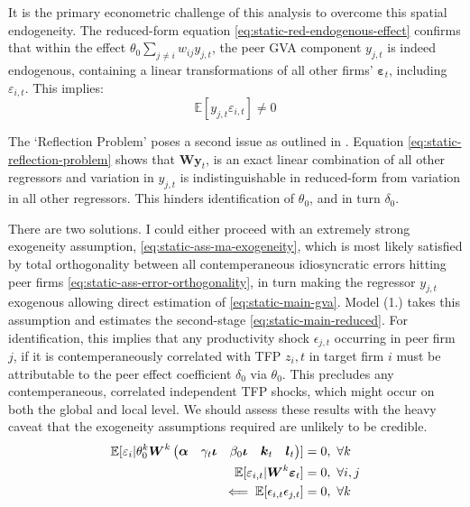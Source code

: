 It is the primary econometric challenge of this analysis to overcome this spatial endogeneity.
The reduced-form equation \eqref{eq:static-red-endogenous-effect} confirms that
within the  effect $\theta_0 \sum_{j\neq i} w_{ij} y_{j,t}$,
the peer GVA component $y_{j,t}$ is indeed endogenous,
containing a linear transformations of all other firms' $\boldsymbol \varepsilon_{t}$,
including $\varepsilon_{i,t}$. This implies:
\begin{equation}
    \mathbb E[y_{j,t}\varepsilon_{i,t}]\neq 0
\end{equation}
\par
The `Reflection Problem' poses a second issue as outlined in \cite{Manski1993}.
Equation \eqref{eq:static-reflection-problem} shows that $\mathbf W \mathbf y_t$,
is an exact linear combination of all other regressors
and variation in $y_{j,t}$ is indistinguishable in reduced-form from variation
in all other regressors.
This hinders identification of $\theta_0$, and in turn $\delta_0$.
\par
There are two solutions. I could either proceed with an extremely strong exogeneity assumption,
\eqref{eq:static-ass-ma-exogeneity}, which is most likely satisfied by total orthogonality
between all contemperaneous idiosyncratic errors hitting peer firms \eqref{eq:static-ass-error-orthogonality},
in turn making the regressor $y_{j,t}$ exogenous allowing direct estimation of \eqref{eq:static-main-gva}.
Model (1.) takes this assumption and estimates the second-stage \eqref{eq:static-main-reduced}.
For identification, this implies that any productivity shock $\epsilon_{j,t}$ occurring in peer firm $j$,
if it is contemperaneously correlated with TFP ${z_i,t}$ in target firm $i$
must be attributable to the peer effect coefficient $\delta_0$ via $\theta_0$.
This precludes any contemperaneous, correlated independent TFP shocks,
which might occur on both the global and local level.
We should assess these results with the heavy caveat that the exogeneity assumptions required are unlikely to be credible.
\begin{align}
    \notag
    \mathbb E[
        \varepsilon_i
        \vert
        \theta_0^k
        \boldsymbol W^k
        \begin{pmatrix}
            \boldsymbol\alpha           &
            \gamma_t \boldsymbol\iota   &
            \beta_0\boldsymbol\iota     &
            \boldsymbol k_t             &
            \boldsymbol l_t             
        \end{pmatrix}
    ] &=0,\  \forall k
    \\
    \label{eq:static-ass-ma-exogeneity}
    \mathbb E[
        \varepsilon_{i,t}
        \vert
        \boldsymbol W^k
        \boldsymbol \varepsilon_t
    ] &=0,\  
    \forall i,j
    \\
    \label{eq:static-ass-error-orthogonality}
    \impliedby \mathbb E[\epsilon_{i,t}\epsilon_{j,t}] &= 0,\ \forall k
\end{align}

